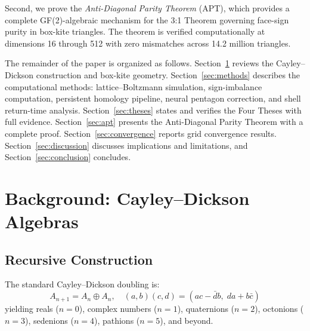 \documentclass[12pt]{article}
\theoremstyle{definition}
\theoremstyle{plain}
\theoremstyle{remark}
\begin{document}
Second, we prove the \emph{Anti-Diagonal Parity Theorem} (APT), which
provides a complete GF(2)-algebraic mechanism for the 3:1 Theorem
governing face-sign purity in box-kite triangles.  The theorem is verified
computationally at dimensions 16 through 512 with zero mismatches across
14.2 million triangles.

The remainder of the paper is organized as follows.
Section~\ref{sec:background} reviews the Cayley--Dickson construction and
box-kite geometry.  Section~\ref{sec:methods} describes the computational
methods: lattice--Boltzmann simulation, sign-imbalance computation,
persistent homology pipeline, neural pentagon correction, and shell
return-time analysis.  Section~\ref{sec:theses} states and verifies the
Four Theses with full evidence.  Section~\ref{sec:apt} presents the
Anti-Diagonal Parity Theorem with a complete proof.
Section~\ref{sec:convergence} reports grid convergence results.
Section~\ref{sec:discussion} discusses implications and limitations, and
Section~\ref{sec:conclusion} concludes.

\section{Background: Cayley--Dickson Algebras}
\label{sec:background}

\subsection{Recursive Construction}

The standard Cayley--Dickson doubling is:
\begin{equation}
  A_{n+1} = A_n \oplus A_n, \quad
  (a,b)(c,d) = (ac - \bar{d}b,\; da + b\bar{c})
  \label{eq:cd}
\end{equation}
yielding reals ($n=0$), complex numbers ($n=1$), quaternions ($n=2$),
octonions ($n=3$), sedenions ($n=4$), pathions ($n=5$), and beyond.
\end{document}
